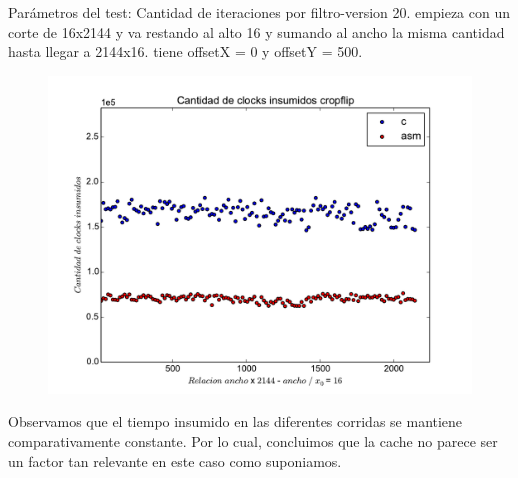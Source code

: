Parámetros del test: 
Cantidad de iteraciones por filtro-version 20.
empieza con un corte de 16x2144 y va restando al alto 16 y sumando al ancho la misma cantidad hasta llegar a 2144x16. tiene offsetX = 0 y offsetY = 500.

\begin{figure}[h]
  \begin{center}
	\includegraphics[scale=0.5]{cachecropflip.pdf}
  \end{center}
\end{figure}


Observamos que el tiempo insumido en las diferentes corridas se mantiene comparativamente constante. Por lo cual, concluimos que la cache no parece ser un factor tan relevante en este caso como suponiamos. 
\newpage